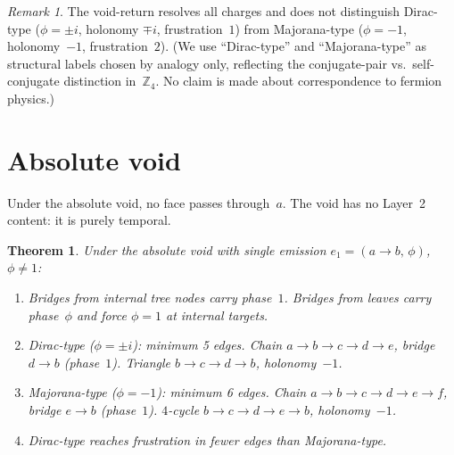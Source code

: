 \documentclass[11pt,a4paper]{article}
\theoremstyle{definition}
\theoremstyle{plain}
\newtheorem{theorem}[definition]{Theorem}
\theoremstyle{remark}
\newtheorem{remark}[definition]{Remark}
\newcommand{\Zf}{\mathbb{Z}_4}
\begin{document}
\begin{remark}
  The void-return resolves all charges and does not distinguish Dirac-type ($\phi = \pm i$, holonomy $\mp i$, frustration~$1$) from Majorana-type ($\phi = -1$, holonomy~$-1$, frustration~$2$).  (We use ``Dirac-type'' and ``Majorana-type'' as structural labels chosen by analogy only, reflecting the conjugate-pair vs.\ self-conjugate distinction in~$\Zf$.  No claim is made about correspondence to fermion physics.)
\end{remark}

\section{Absolute void}\label{sec:nevertarget}

Under the absolute void, no face passes through~$a$.  The void has no Layer~2 content: it is purely temporal.

\begin{theorem}\label{thm:nevertarget}
  Under the absolute void with single emission $e_1 = (a \to b,\, \phi)$, $\phi \neq 1$:

  \begin{enumerate}[nosep,label=(\alph*)]
    \item Bridges from internal tree nodes carry phase~$1$.  Bridges from leaves carry phase~$\phi$ and force $\phi = 1$ at internal targets.

    \item \emph{Dirac-type} ($\phi = \pm i$): minimum 5 edges.  Chain $a \to b \to c \to d \to e$, bridge $d \to b$ (phase~$1$).  Triangle $b \to c \to d \to b$, holonomy~$-1$.

    \item \emph{Majorana-type} ($\phi = -1$): minimum 6 edges.  Chain $a \to b \to c \to d \to e \to f$, bridge $e \to b$ (phase~$1$).  $4$-cycle $b \to c \to d \to e \to b$, holonomy~$-1$.

    \item Dirac-type reaches frustration in fewer edges than Majorana-type.
  \end{enumerate}
\end{theorem}
\end{document}
